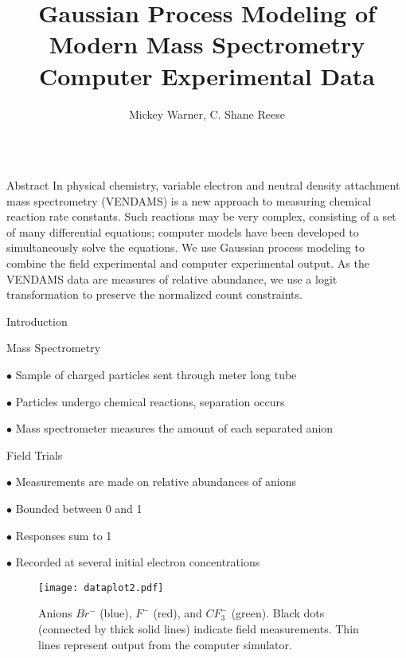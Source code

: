 \documentclass[final]{beamer}
\title{Gaussian Process Modeling of Modern Mass Spectrometry Computer Experimental Data}
\author{Mickey Warner, C. Shane Reese}
\institute{Brigham Young University}
\begin{document}
\begin{frame}{}
\begin{columns}[t]

\begin{column}{.28\linewidth}
    \begin{block}{Abstract}
    In physical chemistry, variable electron and neutral density attachment mass spectrometry (VENDAMS)
    is a new approach to measuring chemical reaction rate constants. Such reactions may be very complex,
    consisting of a set of many differential equations; computer models have been developed to simultaneously
    solve the equations. We use Gaussian process modeling to combine the field experimental and computer
    experimental output. As the VENDAMS data are measures of relative abundance, we use a logit
    transformation to preserve the normalized count constraints.
    \end{block}

    \begin{block}{Introduction}

    \begin{sc}Mass Spectrometry\end{sc}

    $\bullet$ Sample of charged particles sent through meter long tube

    $\bullet$ Particles undergo chemical reactions, separation occurs

    $\bullet$ Mass spectrometer measures the amount of each separated anion

    \bigskip
    \bigskip
    \bigskip
    \bigskip
    \begin{sc}Field Trials\end{sc}

    $\bullet$ Measurements are made on relative abundances of anions

    $\bullet$ Bounded between 0 and 1

    $\bullet$ Responses sum to 1

    $\bullet$ Recorded at several initial electron concentrations
    
    \bigskip
    \bigskip
    \bigskip
    \bigskip
    \begin{figure}
        \texttt{[image: dataplot2.pdf]}
        \caption*{Anions $Br^-$ (blue), $F^-$ (red), and $CF_3^-$ (green). Black dots (connected by thick solid lines) indicate field measurements. Thin lines represent output from the computer simulator.}
    \end{figure}
    \bigskip
    \bigskip
    \bigskip
    \bigskip


\end{block}
\end{column}
\end{columns}
\end{frame}
\end{document}
